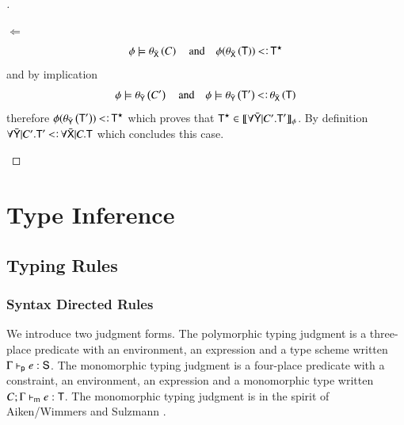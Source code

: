 \documentclass{report}
\begin{document}
\begin{proof}[]
\begin{indcase}{$\Leftarrow$}
      \begin{displaymath}
        \phi\csat\theta_{\bar{\type{X}}}\lrp{C} \quad\textrm{and}\quad
        \phi(\theta_{\bar{\type{X}}}\lrp{\type{T}})\subtype\type{T}^\star
      \end{displaymath}
      and by implication
      \begin{displaymath}
        \phi\csat\theta_{\bar{\type{Y}}}\lrp{C'}\quad\textrm{and}\quad
        \phi\csat\theta_{\bar{\type{Y}}}\lrp{\type{T}'}\subtype\theta_{\bar{\type{X}}}\lrp{\type{T}}
      \end{displaymath}
      therefore $\phi(\theta_{\bar{\type{Y}}}\lrp{\type{T}'})\subtype\type{T}^\star$ which
      proves that $\textsf{T}^\star\in\llbracket{\forall\bar{\textsf{Y}}|C'.\textsf{T}'}\rrbracket_{\phi}$. By definition 
      $\forall\bar{\type{Y}}|C'.\type{T}'\subtype\forall\bar{\type{X}}|C.\type{T}$ which concludes this case.
    \end{indcase}
  \end{proof}
  
  \chapter{Type Inference}
  \section{Typing Rules}
  \subsection{Syntax Directed Rules}
  We introduce two judgment forms. The polymorphic typing judgment is a three-place predicate
  with an environment, an expression and a type scheme written
  $\Gamma\vdash_\textsf{p} e:\textsf{S}$. The monomorphic typing judgment is a
  four-place predicate with a constraint, an environment, an expression and a monomorphic type
  written $C;\Gamma\vdash_\textsf{m} e:\textsf{T}$. The monomorphic typing judgment
  is in the spirit of Aiken/Wimmers and Sulzmann \cite{aiken:ticti, sulzmann97type}.
  
\end{document}
